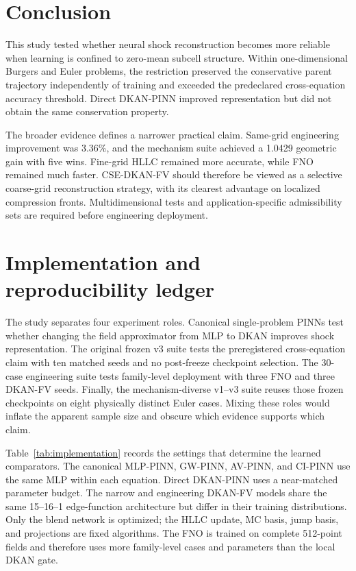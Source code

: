 \documentclass[10pt,twocolumn]{article}
\newcommand{\method}{CSE-DKAN-FV}
\begin{document}
\section{Conclusion}

This study tested whether neural shock reconstruction becomes more reliable when learning is confined to zero-mean subcell structure. Within one-dimensional Burgers and Euler problems, the restriction preserved the conservative parent trajectory independently of training and exceeded the predeclared cross-equation accuracy threshold. Direct DKAN-PINN improved representation but did not obtain the same conservation property.

The broader evidence defines a narrower practical claim. Same-grid engineering improvement was 3.36\%, and the mechanism suite achieved a 1.0429 geometric gain with five wins. Fine-grid HLLC remained more accurate, while FNO remained much faster. \method{} should therefore be viewed as a selective coarse-grid reconstruction strategy, with its clearest advantage on localized compression fronts. Multidimensional tests and application-specific admissibility sets are required before engineering deployment.

\appendix

\section{Implementation and reproducibility ledger}

The study separates four experiment roles. Canonical single-problem PINNs test whether changing the field approximator from MLP to DKAN improves shock representation. The original frozen v3 suite tests the preregistered cross-equation claim with ten matched seeds and no post-freeze checkpoint selection. The 30-case engineering suite tests family-level deployment with three FNO and three DKAN-FV seeds. Finally, the mechanism-diverse v1--v3 suite reuses those frozen checkpoints on eight physically distinct Euler cases. Mixing these roles would inflate the apparent sample size and obscure which evidence supports which claim.

Table~\ref{tab:implementation} records the settings that determine the learned comparators. The canonical MLP-PINN, GW-PINN, AV-PINN, and CI-PINN use the same MLP within each equation. Direct DKAN-PINN uses a near-matched parameter budget. The narrow and engineering DKAN-FV models share the same 15--16--1 edge-function architecture but differ in their training distributions. Only the blend network is optimized; the HLLC update, MC basis, jump basis, and projections are fixed algorithms. The FNO is trained on complete 512-point fields and therefore uses more family-level cases and parameters than the local DKAN gate.
\end{document}
